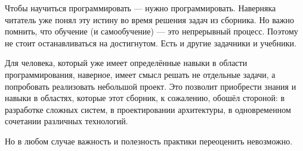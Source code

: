 
Чтобы научиться программировать — нужно программировать. Наверняка
читатель уже понял эту истину во время решения задач из сборника. Но
важно помнить, что обучение (и самообучение) — это непрерывный
процесс. Поэтому не стоит останавливаться на достигнутом. Есть и
другие задачники и учебники.

Для человека, который уже имеет определённые навыки в области
программирования, наверное, имеет смысл решать не отдельные задачи, а
попробовать реализовать небольшой проект. Это позволит приобрести
знания и навыки в областях, которые этот сборник, к сожалению, обошёл
стороной: в разработке сложных систем, в проектировании архитектуры, в
одновременном сочетании различных технологий.

Но в любом случае важность и полезность практики переоценить
невозможно.



